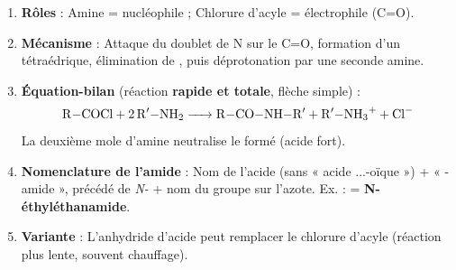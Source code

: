\documentclass[11pt]{article}
\begin{document}
\begin{methode}
\begin{enumerate}
\item \textbf{Rôles} : Amine = nucléophile ; Chlorure d'acyle  = électrophile (C=O).
\item \textbf{Mécanisme} : Attaque du doublet de N sur le C=O, formation d'un tétraédrique, élimination de , puis déprotonation par une seconde amine.
\item \textbf{Équation-bilan} (réaction \textbf{rapide et totale}, flèche simple) :
\[ \ce{R-COCl + 2 R$'$-NH2 -> R-CO-NH-R$'$ + R$'$-NH3+ + Cl-} \]
La deuxième mole d'amine neutralise le  formé (acide fort).
\item \textbf{Nomenclature de l'amide} : Nom de l'acide (sans « acide ...-oïque ») + « -amide », précédé de \emph{N-} + nom du groupe sur l'azote. Ex. :  = \textbf{N-éthyléthanamide}.
\item \textbf{Variante} : L'anhydride d'acide  peut remplacer le chlorure d'acyle (réaction plus lente, souvent chauffage).
\end{enumerate}
\end{methode}
\end{document}
